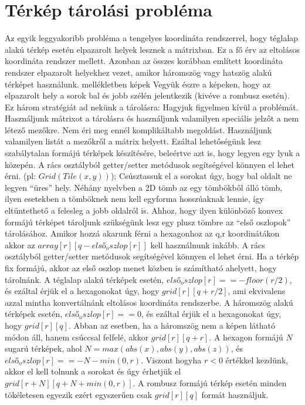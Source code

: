 \chapter{Térkép tárolási probléma}

Az egyik leggyakoribb probléma a tengelyes koordináta rendszerrel, hogy téglalap alakú térkép esetén elpazarolt helyek lesznek a mátrixban. Ez a fő érv az eltolásos koordináta rendszer mellett. Azonban az összes korábban említett koordináta rendszer elpazarolt helyekhez vezet, amikor háromszög vagy hatszög alakú térképet használunk.
\newline
\newline mellékletben képek
\newline
\newline Vegyük észre a képeken, hogy az elpazarolt hely a sorok bal és jobb szélén jelentkezik (kivéve a rombusz esetén). Ez három stratégiát ad nekünk a tárolásra:
\newline
\newline Hagyjuk figyelmen kívül a problémát. Használjunk mátrixot a tárolásra és használjunk valamilyen speciális jelzőt a nem létező mezőkre. Nem éri meg ennél komplikáltabb megoldást.
Használjunk valamilyen listát a mezőkről a mátrix helyett. Ezáltal lehetőségünk lesz szabálytalan formájú térképek készítésére, beleértve azt is, hogy legyen egy lyuk a közepén. A rács osztályból getter/setter metódusok segítségével könnyen el lehet érni. (pl: $Grid(Tile(x,y))$);
Csúsztassuk el a sorokat úgy, hogy bal oldalt ne legyen “üres” hely. Néhány nyelvben a 2D tömb az egy tömbökből álló tömb, ilyen esetekben a tömböknek nem kell egyforma hosszúaknak lennie, így eltüntethető a felesleg a jobb oldalról is.
\newline
\newline Ahhoz, hogy ilyen különböző konvex formájú térképet tároljunk szükségünk lesz egy plusz tömbre az “első oszlopok” tárolásához. Amikor hozzá akarunk férni a hexagonhoz az q,r koordinátákon akkor az $array[r][q - első_oszlop[r]]$ kell használnunk inkább. A rács osztályból getter/setter metódusok segítségével könnyen el lehet érni.
\newline
\newline Ha a térkép fix formájú, akkor az első oszlop menet közben is számítható ahelyett, hogy tárolnánk.
\newline
\newline A téglalap alakú térképek esetén, $első_oszlop[r] == -floor(r/2)$, és ezáltal érjük el a hexagonokat úgy, hogy $grid[r][q + r/2]$, ami ekvivalens azzal mintha konvertálnánk eltolásos koordináta rendszerbe.
A háromszög alakú térképek esetén, $első_oszlop[r] == 0$, és ezáltal érjük el a hexagonokat úgy, hogy $grid[r][q]$. Abban az esetben, ha a háromszög nem a képen látható módon áll, hanem csúccsal felfelé, akkor $grid[r][q + r]$.
A hexagon formájú $N$ sugarú térképek, ahol $N = max(abs(x), abs(y), abs(z))$, és $első_oszlop[r] == -N - min(0, r)$. Viszont hogyha $r < 0$ értékkel kezdünk, akkor el kell tolnunk a sorokat és úgy érhetjük el $grid[r + N][q + N + min(0, r)]$.
A rombusz formájú térkép esetén minden tökéletesen egyezik ezért egyszerűen csak $grid[r][q]$ formát használjuk.
